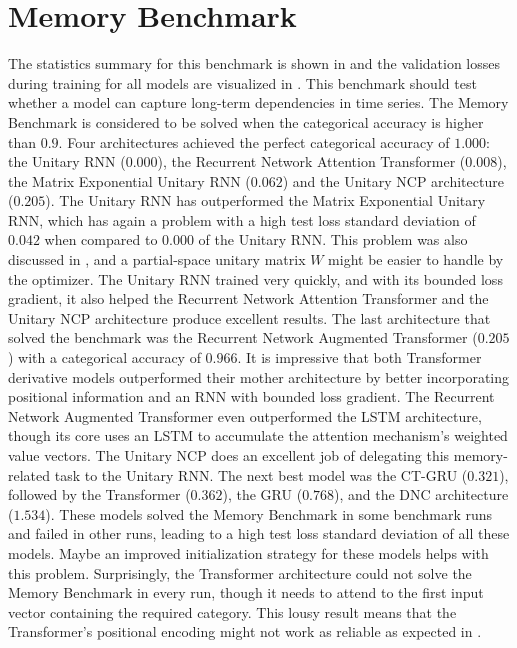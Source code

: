 \documentclass[draft,final]{vutinfth} %
\begin{document}
    \section{Memory Benchmark} \label{memory_results}
    The statistics summary for this benchmark is shown in  and the validation losses during training for all models are visualized in .
    This benchmark should test whether a model can capture long-term dependencies in time series.
    The Memory Benchmark is considered to be solved when the categorical accuracy is higher than $0.9$.
    Four architectures achieved the perfect categorical accuracy of $1.000$: the Unitary RNN ($0.000$), the Recurrent Network Attention Transformer ($0.008$), the Matrix Exponential Unitary RNN ($0.062$) and the Unitary NCP architecture ($0.205$).
    The Unitary RNN has outperformed the Matrix Exponential Unitary RNN, which has again a problem with a high test loss standard deviation of $0.042$ when compared to $0.000$ of the Unitary RNN.
    This problem was also discussed in , and a partial-space unitary matrix $W$ might be easier to handle by the optimizer.
    The Unitary RNN trained very quickly, and with its bounded loss gradient, it also helped the Recurrent Network Attention Transformer and the Unitary NCP architecture produce excellent results.
    The last architecture that solved the benchmark was the Recurrent Network Augmented Transformer ($0.205$) with a categorical accuracy of $0.966$.
    It is impressive that both Transformer derivative models outperformed their mother architecture by better incorporating positional information and an RNN with bounded loss gradient.
    The Recurrent Network Augmented Transformer even outperformed the LSTM architecture, though its core uses an LSTM to accumulate the attention mechanism's weighted value vectors.
    The Unitary NCP does an excellent job of delegating this memory-related task to the Unitary RNN.
    The next best model was the CT-GRU ($0.321$), followed by the Transformer ($0.362$), the GRU ($0.768$), and the DNC architecture ($1.534$).
    These models solved the Memory Benchmark in some benchmark runs and failed in other runs, leading to a high test loss standard deviation of all these models.
    Maybe an improved initialization strategy for these models helps with this problem.
    Surprisingly, the Transformer architecture could not solve the Memory Benchmark in every run, though it needs to attend to the first input vector containing the required category.
    This lousy result means that the Transformer's positional encoding might not work as reliable as expected in \cite[p. 5-6]{Transformer}.
\end{document}
